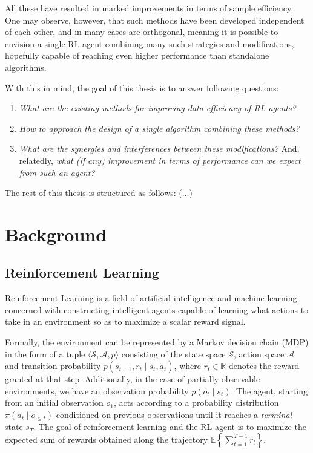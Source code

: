 \documentclass[twoside,11pt]{article}
\begin{document}
All these have resulted in marked improvements in terms of sample efficiency. One may observe, however, that such methods have been developed independent of each other, and in many cases are orthogonal, meaning it is possible to envision a single RL agent combining many such strategies and modifications, hopefully capable of reaching even higher performance than standalone algorithms.

With this in mind, the goal of this thesis is to answer following questions:

\begin{enumerate}
    \item \emph{What are the existing methods for improving data efficiency of RL agents?}
    \item \emph{How to approach the design of a single algorithm combining these methods?}
    \item \emph{What are the synergies and interferences between these modifications?} And, relatedly, \emph{what (if any) improvement in terms of performance can we expect from such an agent?}
\end{enumerate}

The rest of this thesis is structured as follows: (...)

\section{Background}

\subsection{Reinforcement Learning}

Reinforcement Learning is a field of artificial intelligence and machine learning concerned with constructing intelligent agents capable of learning what actions to take in an environment so as to maximize a scalar reward signal.

Formally, the environment can be represented by a Markov decision chain (MDP) in the form of a tuple $\langle \mathcal{S}, \mathcal{A}, p \rangle$ consisting of the state space $\mathcal{S}$, action space $\mathcal{A}$ and transition probability $p(s_{t+1}, r_{t} \mid s_t, a_t)$, where $r_t \in \mathbb{R}$ denotes the reward granted at that step. Additionally, in the case of partially observable environments, we have an observation probability $p(o_t \mid s_t)$. The agent, starting from an initial observation $o_1$, acts according to a probability distribution $\pi(a_t \mid o_{\leq t})$ conditioned on previous observations until it reaches a \emph{terminal} state $s_T$. The goal of reinforcement learning and the RL agent is to maximize the expected sum of rewards obtained along the trajectory $\mathbb{E} \left\{\sum_{t=1}^{T-1} r_t\right\}$.
\end{document}
